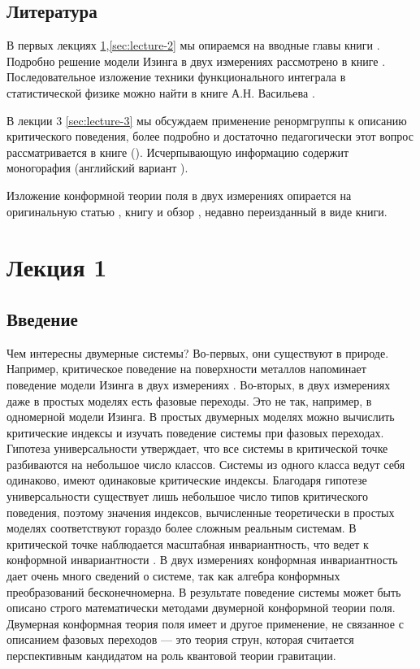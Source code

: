 \documentclass[a4paper,12pt]{article}
\theoremstyle{definition}
\theoremstyle{definition}
\theoremstyle{definition}
\begin{document}
\subsection{Литература}
\label{sec:literature}
В первых лекциях \ref{sec:lecture-1},\ref{sec:lecture-2} мы опираемся на вводные главы книги \cite{difrancesco1997cft}. Подробно решение  модели Изинга в двух измерениях рассмотрено в книге  \cite{belavin2001lect}. Последовательное изложение техники функционального интеграла в статистической физике можно найти в книге А.Н. Васильева \cite{vasiliev1976}.

В лекции 3 \ref{sec:lecture-3} мы обсуждаем применение ренормгруппы к описанию критического поведения, более подробно и достаточно педагогически этот вопрос рассматривается в книге \cite{ma1980} (\cite{ma2000modern}). Исчерпывающую информацию содержит моногорафия \cite{vasiliev1998} (английский вариант \cite{Vasilev:1027193}).

Изложение конформной теории поля в двух измерениях опирается на оригинальную статью \cite{belavin1984ics}, книгу \cite{difrancesco1997cft} и обзор \cite{zamolodchikov1989rus,zamolodchikov1989conformal}, недавно переизданный в виде книги.

\section{Лекция 1}
\label{sec:lecture-1}

\subsection{Введение}
\label{sec:intro}
Чем интересны двумерные системы? Во-первых, они существуют в природе. Например, критическое поведение на поверхности металлов напоминает поведение модели Изинга в двух измерениях \cite{campuzano1985110}. Во-вторых, в двух измерениях даже в простых моделях есть фазовые переходы. Это не так, например,  в одномерной модели Изинга. В простых двумерных моделях можно вычислить критические индексы и изучать поведение системы при фазовых переходах. Гипотеза универсальности утверждает, что все системы в критической точке разбиваются на небольшое число классов. Системы из одного класса ведут себя одинаково, имеют одинаковые критические индексы. Благодаря гипотезе универсальности существует лишь небольшое число типов критического поведения, поэтому значения индексов, вычисленные теоретически в простых моделях соответствуют гораздо более сложным реальным системам.
В критической точке наблюдается масштабная инвариантность, что ведет к конформной инвариантности \cite{Polyakov:1970xd}. В двух измерениях конформная инвариантность дает очень много сведений о системе, так как алгебра конформных преобразований бесконечномерна. В результате поведение системы может быть описано строго математически методами двумерной конформной теории поля. Двумерная конформная теория поля имеет и другое применение, не связанное с описанием фазовых переходов --- это теория струн, которая считается перспективным кандидатом на роль квантовой теории гравитации.
\end{document}
